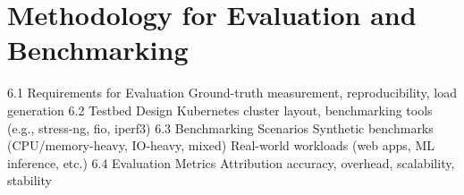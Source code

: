 \chapter{Methodology for Evaluation and Benchmarking} %
\label{Chapter6}

    6.1 Requirements for Evaluation
        Ground-truth measurement, reproducibility, load generation
    6.2 Testbed Design
        Kubernetes cluster layout, benchmarking tools (e.g., stress-ng, fio, iperf3)
    6.3 Benchmarking Scenarios
        Synthetic benchmarks (CPU/memory-heavy, IO-heavy, mixed)
        Real-world workloads (web apps, ML inference, etc.)
    6.4 Evaluation Metrics
        Attribution accuracy, overhead, scalability, stability





\begin{comment}
    - Have I essentially just made KEPLER worse by introducing non-precise estimations?

\end{comment}